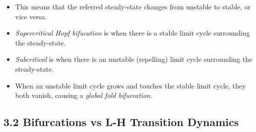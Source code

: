 \documentclass[a4paper]{article}
\begin{document}
\begin{itemize}
  \begin{itemize}
  \item
    This means that the referred steady-state changes from unstable to
    stable, or vice versa.
  \item
    \emph{Supercritical Hopf bifucation} is when there is a stable limit
    cycle surrounding the steady-state.
  \item
    \emph{Subcritical} is when there is an unstable (repelling) limit
    cycle surrounding the steady-state.
  \item
    When an unstable limit cycle grows and touches the stable limit
    cycle, they both vanish, causing a \emph{global fold bifurcation}.
  \end{itemize}
\end{itemize}

\subsection{3.2 Bifurcations vs L-H Transition
Dynamics}\label{bifurcations-vs-l-h-transition-dynamics}
\end{document}
